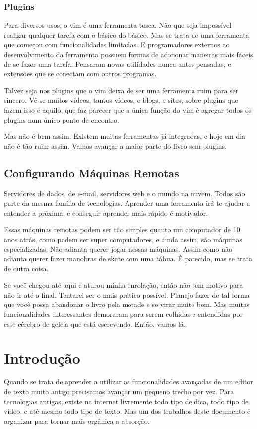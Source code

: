 \documentclass[a4paper, 12pt]{article}
\begin{document}
\subsubsection{Plugins}
Para diversos usos, o vim é uma ferramenta tosca.
Não que seja impossível realizar qualquer tarefa com o básico do básico.
Mas se trata de uma ferramenta que começou com funcionalidades limitadas.
E programadores externos ao desenvolvimento da ferramenta possuem formas de adicionar maneiras mais fáceis de se fazer uma tarefa.
Pensaram novas utilidades nunca antes pensadas, e extensões que se conectam com outros programas.

Talvez seja nos plugins que o vim deixa de ser uma ferramenta ruim para ser sincero.
Vê-se muitos vídeos, tantos vídeos, e blogs, e sites, sobre plugins que fazem isso e aquilo, que faz parecer que a única função do vim é agregar todos os plugins num único ponto de encontro.

Mas não é bem assim. Existem muitas ferramentas já integradas, e hoje em dia não é tão ruim assim.
Vamos avançar a maior parte do livro sem plugins.

\subsection{Configurando Máquinas Remotas}
Servidores de dados, de e-mail, servidores web e o mundo na nuvem.
Todos são parte da mesma família de tecnologias.
Aprender uma ferramenta irá te ajudar a entender a próxima, e conseguir aprender mais rápido é motivador.

Essas máquinas remotas podem ser tão simples quanto um computador de 10 anos atrás, como podem ser super computadores, e ainda assim, são máquinas especializadas.
Não adianta querer jogar nessas máquinas.
Assim como não adianta querer fazer manobras de skate com uma tábua.
É parecido, mas se trata de outra coisa.

Se você chegou até aqui e aturou minha enrolação, então não tem motivo para não ir até o final.
Tentarei ser o mais prático possível.
Planejo fazer de tal forma que você possa abandonar o livro pela metade e se virar muito bem.
Mas muitas funcionalidades interessantes demoraram para serem colhidas e entendidas por esse cérebro de geleia que está escrevendo. Então, vamos lá.

\newpage

\section{Introdução}
Quando se trata de aprender a utilizar as funcionalidades avançadas de um editor de texto muito antigo precisamos avançar um pequeno trecho por vez.
Para tecnologias antigas, existe na internet livremente todo tipo de dica, todo tipo de vídeo, e até mesmo todo tipo de texto.
Mas um dos trabalhos deste documento é organizar para tornar mais orgânica a absorção.
\end{document}
